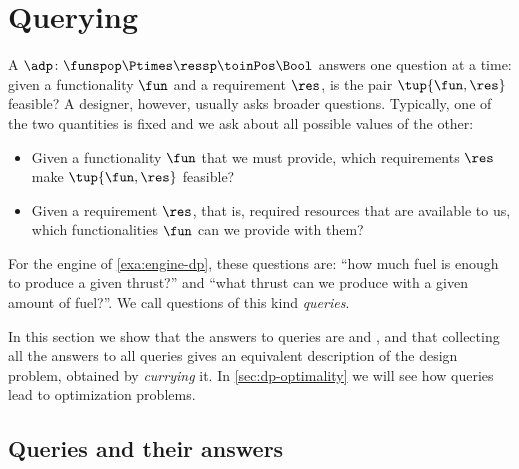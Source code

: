 

\section{Querying}
\label{sec:dp-querying}


A  $\adp \colon \funspop \Ptimes \ressp \toinPos \Bool$ answers one question at a time: given a functionality $\fun$ and a requirement $\res$, is the pair $\tup{\fun, \res}$ feasible?
A designer, however, usually asks broader questions.
Typically, one of the two quantities is fixed and we ask about all possible values of the other:
\begin{itemize}
    \item Given a functionality $\fun$ that we must provide, which requirements $\res$ make $\tup{\fun, \res}$ feasible?
    \item Given a requirement $\res$, that is, required resources that are available to us, which functionalities $\fun$ can we provide with them?
\end{itemize}
For the engine of \cref{exa:engine-dp}, these questions are: ``how much fuel is enough to produce a given thrust?'' and ``what thrust can we produce with a given amount of fuel?''.
We call questions of this kind \emph{queries}.

In this section we show that the answers to queries are  and , and that collecting all the answers to all queries gives an equivalent description of the design problem, obtained by \emph{currying} it.
In \cref{sec:dp-optimality} we will see how queries lead to optimization problems.

\subsection{Queries and their answers}

